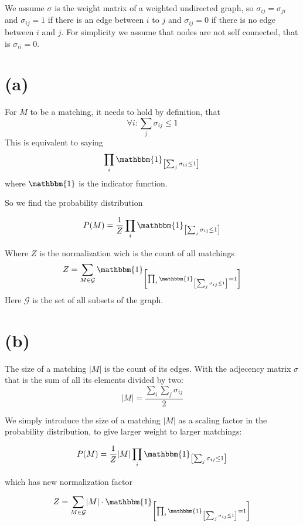 \documentclass[a4paper]{scrartcl}
\begin{document}
We assume $\sigma$ is the weight matrix of a weighted undirected graph, so $\sigma_{ij} = \sigma_{ji}$ and $\sigma_{ij} = 1$ if there is an edge between $i$ to $j$ and $\sigma_{ij} = 0$ if there is no edge between $i$ and $j$.
For simplicity we assume that nodes are not self connected, that is $\sigma_{ii} = 0$.

\section*{(a)}

For $M$ to be a matching, it needs to hold by definition, that $$\forall i:  \sum_j \sigma_{ij} \leq 1$$ This is equivalent to saying $$ \prod_i \mathbbm{1}_{\left[\sum_j \sigma_{ij} \leq 1\right]} $$
where $\mathbbm{1}$ is the indicator function.

So we find the probability distribution

\begin{align}
    P(M) = \frac{1}{Z}\prod_i \mathbbm{1}_{\left[\sum_j \sigma_{ij} \leq 1\right]}
\end{align}

Where $Z$ is the normalization wich is the count of all matchings 
\begin{align}
    Z = \sum_{M \in \mathcal{G}} \mathbbm{1}_{\left[ \prod_i \mathbbm{1}_{\left[\sum_j \sigma_{ij} \leq 1\right]} = 1 \right]} 
\end{align}
Here $\mathcal{G}$ is the set of all subsets of the graph.

\section*{(b)}

The size of a matching $\lvert M \rvert$ is the count of its edges. With the adjecency matrix $\sigma$ that is the sum of all its elements divided by two: $$ \lvert M \rvert = \frac{\sum_{i} \sum_{j} \sigma_{ij}}{2}$$

We simply introduce the size of a matching $\lvert M \rvert$ as a scaling factor in the probability distribution, to give larger weight to larger matchings:

\begin{align}
    P(M) = \frac{1}{Z} \lvert M \rvert \prod_i \mathbbm{1}_{\left[\sum_j \sigma_{ij} \leq 1\right]}
\end{align}

which has new normalization factor

\begin{align}
    Z = \sum_{M \in \mathcal{G}} \lvert M \rvert \cdot \mathbbm{1}_{\left[ \prod_i \mathbbm{1}_{\left[\sum_j \sigma_{ij} \leq 1\right]} = 1 \right]} 
\end{align}
\end{document}
